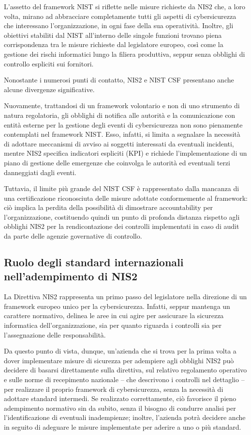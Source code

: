 L'assetto del framework NIST si riflette nelle misure richieste da NIS2 che, a loro volta, mirano ad abbracciare completamente
tutti gli aspetti di cybersicurezza che interessano l'organizzazione, in ogni fase della sua operatività. Inoltre, gli obiettivi stabiliti
dal NIST all'interno delle singole funzioni trovano piena corrispondenza tra le misure richieste dal legislatore europeo, così come la
gestione dei rischi informatici lungo la filiera produttiva, seppur senza obblighi di controllo espliciti sui fornitori.

Nonostante i numerosi punti di contatto, NIS2 e NIST CSF presentano anche alcune divergenze significative. 

Nuovamente, trattandosi di un framework volontario e non di uno strumento di natura regolatoria, gli obblighi di notifica alle autorità
e la comunicazione con entità esterne per la gestione degli eventi di cybersicurezza
non sono pienamente contemplati nel framework NIST. Esso, infatti, si limita a segnalare la necessità di adottare meccanismi di avviso 
ai soggetti interessati da eventuali incidenti, mentre NIS2 specifica indicatori espliciti (KPI) e richiede l'implementazione di un 
piano di gestione delle emergenze che coinvolga le autorità ed eventuali terzi danneggiati dagli eventi.

Tuttavia, il limite più grande del NIST CSF è rappresentato dalla mancanza di una certificazione riconosciuta delle misure adottate 
conformemente al framework: ciò implica la perdita della possibilità di dimostrare accountability per l'organizzazione, costituendo quindi
un punto di profonda distanza rispetto agli obblighi NIS2 per la rendicontazione dei controlli implementati in caso di audit da parte delle 
agenzie governative di controllo.


\subsection{Ruolo degli standard internazionali nell'adempimento di NIS2}
La Direttiva NIS2 rappresenta un primo passo del legislatore nella direzione di un framework europeo unico per la cybersicurezza. Infatti, 
seppur mantenga un carattere normativo, delinea le aree in cui agire per assicurare la sicurezza informatica dell'organizzazione,
sia per quanto riguarda i controlli sia per l'assegnazione delle responsabilità.

Da questo punto di vista, dunque, un'azienda che si trova per la prima volta a dover implementare misure di sicurezza per adempiere agli 
obblighi NIS2 può decidere di basarsi direttamente sulla direttiva, sul relativo regolamento operativo e sulle norme di recepimento
nazionale -- che descrivono i controlli nel dettaglio -- per realizzare il proprio framework di cybersicurezza, senza la necessità di 
adottare standard intermedi. Se realizzato correttamente, ciò favorisce il pieno adempimento normativo sin da subito, senza il bisogno di condurre
analisi per l'identificazione di eventuali inadempienze; inoltre, l'azienda potrà decidere anche in seguito di adeguare le misure implementate
per aderire a uno o più standard.

